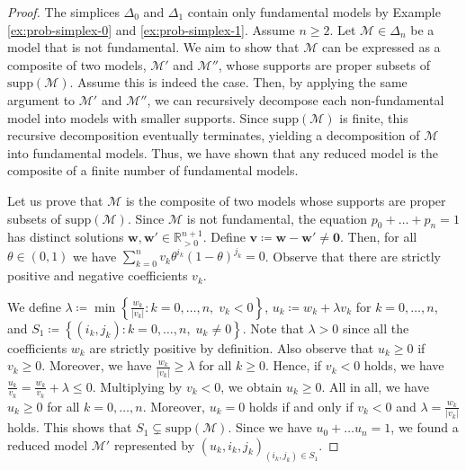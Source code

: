 \begin{proof}
    The simplices \( \Delta_0 \) and \( \Delta_1 \) contain only fundamental models by Example \ref{ex:prob-simplex-0} and \ref{ex:prob-simplex-1}. Assume \( n \geq 2 \). Let \( \mathcal{M} \in \Delta_n \) be a model that is not fundamental. We aim to show that \( \mathcal{M} \) can be expressed as a composite of two models, \( \mathcal{M}' \) and \( \mathcal{M}'' \), whose supports are proper subsets of \( \mathrm{supp}(\mathcal{M}) \). Assume this is indeed the case. Then, by applying the same argument to \( \mathcal{M}' \) and \( \mathcal{M}'' \), we can recursively decompose each non-fundamental model into models with smaller supports. Since \( \mathrm{supp}(\mathcal{M}) \) is finite, this recursive decomposition eventually terminates, yielding a decomposition of \( \mathcal{M} \) into fundamental models. Thus, we have shown that any reduced model is the composite of a finite number of fundamental models. 

    Let us prove that \( \mathcal{M} \) is the composite of two models whose supports are proper subsets of \( \mathrm{supp}(\mathcal{M}) \). Since \( \mathcal{M} \) is not fundamental, the equation \( p_0 + \dots + p_n = 1 \) has distinct solutions \( \mathbf w, \mathbf w' \in \mathbb{R}^{n+1}_{> 0} \). Define \( \mathbf v \coloneqq \mathbf w - \mathbf w' \neq \mathbf 0 \). Then, for all \( \theta \in (0,1) \) we have \( \sum_{k=0}^n v_k \theta^{i_k}(1-\theta)^{j_k} = 0  \).
    Observe that there are strictly positive and negative coefficients \( v_k \). 
    
    We define \( \lambda \coloneqq \min \left\{ \frac{w_k}{\lvert v_k \rvert} : k = 0, \dots, n, \; v_k < 0 \right\} \), \( u_k \coloneqq w_k + \lambda v_k \) for \(k = 0, \dots, n \), and \( S_1 \coloneqq \left\{ (i_k, j_k) : k=0, \dots, n, \; u_k \neq 0 \right\} \). Note that \( \lambda > 0 \) since all the coefficients \( w_k \) are strictly positive by definition. Also observe that \( u_k \geq 0 \) if \( v_k \geq 0 \). Moreover, we have \( \frac{w_k}{\lvert v_k \rvert} \geq \lambda \) for all \( k \geq 0 \). Hence, if \( v_k < 0 \) holds, we have \( \frac{u_k}{v_k} = \frac{w_k}{v_k} + \lambda  \leq 0\). Multiplying by \( v_k < 0 \), we obtain \( u_k \geq 0 \). All in all, we have \( u_k \geq 0 \) for all \( k = 0, \dots, n \). Moreover, \( u_k = 0 \) holds if and only if \( v_k < 0 \) and \( \lambda = \frac{w_k}{\lvert v_k \rvert} \) holds. This shows that \( S_1 \subsetneq \mathrm{supp}(\mathcal{M}) \). Since we have \( u_0 + \dots u_n = 1 \), we found a reduced model \( \mathcal{M}' \) represented by \( (u_k, i_k, j_k)_{(i_k,j_k) \in S_1} \).


\end{proof}
